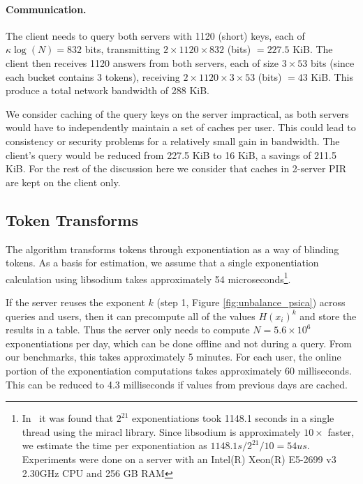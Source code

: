 {	\paragraph{Communication.} The client needs to query both servers with 1120 (short) keys, each of $\kappa\log(N)=832$ bits, transmitting $2 \times 1120 \times 832$ (bits) $=227.5$ KiB. The client then receives 1120 answers from both servers, each of size $3 \times 53$ bits (since each bucket contains 3 tokens), receiving $2 \times 1120 \times 3 \times 53$ (bits) $= 43$ KiB. This produce a total network bandwidth of 288 KiB.
	
	We consider caching of the query keys on the server impractical, as both servers would have to independently maintain a set of caches per user. This could lead to consistency or security problems for a relatively small gain in bandwidth. The client's query would be reduced from 227.5 KiB to 16 KiB, a savings of 211.5 KiB. For the rest of the discussion here we consider that caches in 2-server PIR are kept on the client only.
	
	\subsection{Token Transforms}
	
	The \psica algorithm transforms tokens through exponentiation as a way of blinding tokens. As a basis for estimation, we assume that a single exponentiation calculation using libsodium takes approximately 54 microseconds\footnote{ In~\cite[Table~2]{C:PRTY19} it was found that $2^{21}$ exponentiations took 1148.1 seconds in a single thread using the miracl library. Since libsodium is approximately $10\times$ faster, we estimate the time per exponentiation as $1148.1 s / 2^{21} / 10 = 54 us$. Experiments were done on a server with an Intel(R) Xeon(R) E5-2699 v3 2.30GHz CPU and 256 GB RAM}.
	
	If the server reuses the exponent $k$ (step 1, Figure \ref{fig:unbalance_psica}) across queries and users, then it can precompute all of the values $H(x_i)^k$ and store the results in a table. Thus the server only needs to compute $N=5.6 \times 10^6$ exponentiations per day, which can be done offline and not during a query. From our benchmarks, this takes approximately 5 minutes. For each user, the online portion of the exponentiation computations takes approximately 60 milliseconds. %
	This can be reduced to 4.3 milliseconds if values from previous days are cached.
	
}
